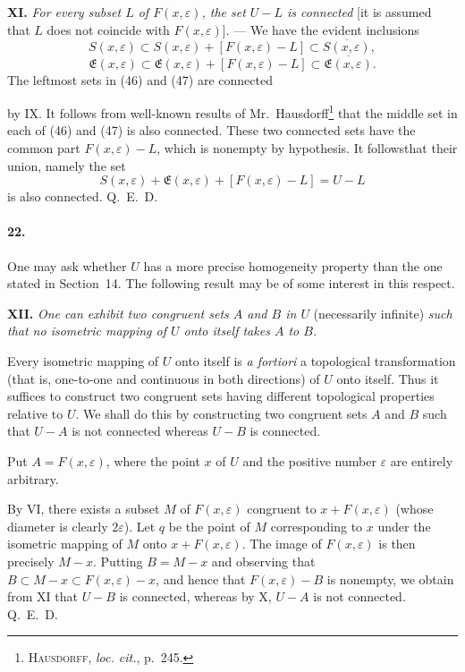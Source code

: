 \documentclass[a4paper,12pt]{amsart}
\newcommand{\srcpage}[1]{} %
\begin{document}
\textbf{XI.} \textit{For every subset $L$ of $F(x,\varepsilon)$, the set $U-L$ is connected} [it is assumed that $L$ does not coincide with $F(x,\varepsilon)$]. --- We have the evident inclusions
\begin{equation}S(x,\varepsilon)\subset S(x,\varepsilon)+[F(x,\varepsilon)-L]\subset\overline{S(x,\varepsilon)},\tag{46}\end{equation}
\begin{equation}\mathfrak{E}(x,\varepsilon)\subset\mathfrak{E}(x,\varepsilon)+[F(x,\varepsilon)-L]\subset\overline{\mathfrak{E}(x,\varepsilon)}.\tag{47}\end{equation}
The leftmost sets in (46) and (47) are connected
\srcpage{87}
by IX. It follows from well-known results of Mr.~Hausdorff\footnote{\textsc{Hausdorff}, \textit{loc. cit.}, p.~245.} that the middle set in each of (46) and (47) is also connected. These two connected sets have the common part $F(x,\varepsilon)-L$, which is nonempty by hypothesis. It follows\footnotemark[\value{footnote}] that their union, namely the set
\[S(x,\varepsilon)+\mathfrak{E}(x,\varepsilon)+[F(x,\varepsilon)-L]=U-L\]
is also connected. \hfill \mbox{Q. E. D.}

\paragraph{22.}
One may ask whether $U$ has a more precise homogeneity property than the one stated in Section~14. The following result may be of some interest in this respect.

\textbf{XII.} \textit{One can exhibit two congruent sets $A$ and $B$ in $U$} (necessarily infinite) \textit{such that no isometric mapping of $U$ onto itself takes $A$ to $B$.}

Every isometric mapping of $U$ onto itself is \textit{a fortiori} a topological transformation (that is, one-to-one and continuous in both directions) of $U$ onto itself. Thus it suffices to construct two congruent sets having different topological properties relative to $U$. We shall do this by constructing two congruent sets $A$ and $B$ such that $U-A$ is not connected whereas $U-B$ is connected.

Put $A=F(x,\varepsilon)$, where the point $x$ of $U$ and the positive number $\varepsilon$ are entirely arbitrary.

By VI, there exists a subset $M$ of $F(x,\varepsilon)$ congruent to $x+F(x,\varepsilon)$ (whose diameter is clearly $2\varepsilon$). Let $q$ be the point of $M$ corresponding to $x$ under the isometric mapping of $M$ onto $x+F(x,\varepsilon)$. The image of $F(x,\varepsilon)$ is then precisely $M-x$. Putting $B=M-x$ and observing that $B\subset M-x\subset F(x,\varepsilon)-x$, and hence that $F(x,\varepsilon)-B$ is nonempty, we obtain from XI that $U-B$ is connected, whereas by X, $U-A$ is not connected. \hfill \mbox{Q. E. D.}
\end{document}
